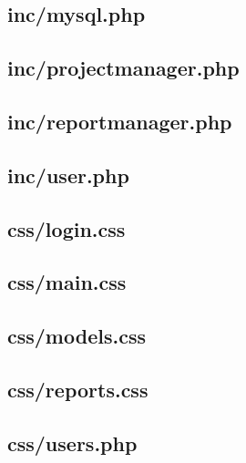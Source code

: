 \documentclass[11pt,a4paper,spanish,twoside]{book}
\begin{document}
\subsection{inc/mysql.php}
%

\subsection{inc/projectmanager.php}
%

\subsection{inc/reportmanager.php}
%

\subsection{inc/user.php}
%

\subsection{css/login.css}
%

\subsection{css/main.css}
%

\subsection{css/models.css}
%

\subsection{css/reports.css}
%

\subsection{css/users.php}
%

\appendix
\end{document}
